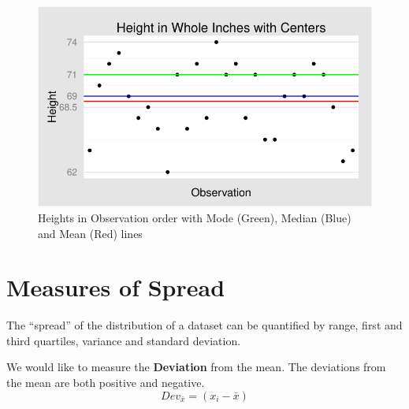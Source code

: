 \documentclass[nohyper,justified]{tufte-handout}\usepackage[]{graphicx}\usepackage[]{color}
\makeatletter
\def\maxwidth{ %
  \ifdim\Gin@nat@width>\linewidth
    \linewidth
  \else
    \Gin@nat@width
  \fi
}
\newenvironment{knitrout}{}{} %
\makeatother
\begin{document}
\begin{knitrout}
\color{fgcolor}\begin{figure}

{\centering \includegraphics[width=\maxwidth]{figure/graphics-center-chart-1} 

}

\caption[Heights in Observation order with Mode (Green), Median (Blue) and Mean (Red) lines]{Heights in Observation order with Mode (Green), Median (Blue) and Mean (Red) lines}\label{fig:center-chart}
\end{figure}


\end{knitrout}



\section{Measures of Spread}

The ``spread'' of the distribution of a dataset can be quantified by range, first and third quartiles, variance and standard deviation.

We would like to measure the \textbf{Deviation} from the mean. The deviations from the mean are both positive and negative.
\begin{equation*}
Dev_{\bar{x}}=(x_i-\bar{x}) 
\end{equation*}
\end{document}
